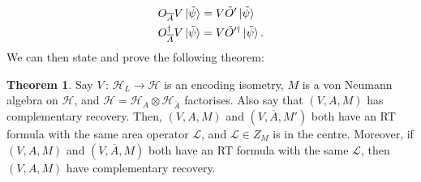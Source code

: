 \documentclass[12pt,a4paper]{report}
\numberwithin{equation}{section}
\newcommand{\ol}[1]{\overline{#1}}
\theoremstyle{definition}
\theoremstyle{theorem}
\newtheorem{theorem}{Theorem}[section]
\theoremstyle{theorem}
\theoremstyle{example}
\theoremstyle{definition}
\begin{document}
\begin{equation}
	\begin{aligned}
		O_{\ol{A}}V\ket{\tilde{\psi}}&=V\tilde{O}'\ket{\tilde{\psi}}\\
		O_{\ol{A}}^{\dagger}V\ket{\tilde{\psi}}&=V\tilde{O}'^{\dagger}\ket{\tilde{\psi}}.
	\end{aligned}
\end{equation}
We can then state and prove the following theorem:
\begin{theorem}\label{bij}
	Say $V\,:\,\mathcal{H}_{L}\to\mathcal{H}$ is an encoding isometry, $M$ is a von Neumann algebra on $\mathcal{H}$, and $\mathcal{H}=\mathcal{H}_{A}\otimes\mathcal{H}_{\ol{A}}$ factorises. Also say that $(V,A,M)$ has complementary recovery. Then, $(V,A,M)$ and $(V,\ol{A},M')$ both have an RT formula with the same area operator $\mathcal{L}$, and $\mathcal{L}\in Z_{M}$ is in the centre. Moreover, if $(V,A,M)$ and $(V,\ol{A},M)$ both have an RT formula with the same $\mathcal{L}$, then $(V,A,M)$ have complementary recovery.
\end{theorem}
\end{document}

